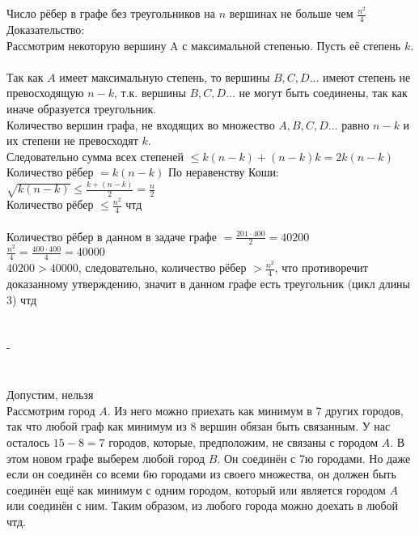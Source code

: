 \documentclass{article}
\begin{document}
\section{}
Число рёбер в графе без треугольников на $n$ вершинах не больше чем $\frac{n^2}{4}$\\
Доказательство:\\
Рассмотрим некоторую вершину A с максимальной степенью. Пусть её степень $k$.\\
\\
Так как $A$ имеет максимальную степень, то вершины $B,C,D...$ имеют степень не превосходящую $n-k$, т.к. вершины $B,C,D...$ не могут быть соединены, так как иначе образуется треугольник.\\
Количество вершин графа, не входящих во множество $A,B,C,D...$ равно $n-k$ и их степени не превосходят $k$.\\
Следовательно сумма всех степеней $\leq k(n-k)+(n-k)k = 2k(n-k)$
\\Количество рёбер $= k(n-k)$
По неравенству Коши: $\sqrt{k(n-k)} \leq \frac{k+(n-k)}{2} = \frac{n}{2}$\\
Количество рёбер $\leq \frac{n^2}{4}$ чтд\\
\\
Количество рёбер в данном в задаче графе $= \frac{201\cdot 400}{2} = 40200$\\
$\frac{n^2}{4} = \frac{400\cdot 400}{4} = 40000$\\
$40200 > 40000$, следовательно, количество рёбер $> \frac{n^2}{4}$, что противоречит доказанному утверждению, значит в данном графе есть треугольник (цикл длины 3) чтд
\section{}
-
\section{}
Допустим, нельзя\\
Рассмотрим город $A$. Из него можно приехать как минимум в 7 других городов, так что любой граф как минимум из 8 вершин обязан быть связанным. У нас осталось $15-8=7$ городов, которые, предположим, не связаны с городом $A$. В этом новом графе выберем любой город $B$. Он соединён с 7ю городами. Но даже если он соединён со всеми 6ю городами из своего множества, он должен быть соединён ещё как минимум с одним городом, который или является городом $A$ или соединён с ним. Таким образом, из любого города можно доехать в любой чтд.
\end{document}
